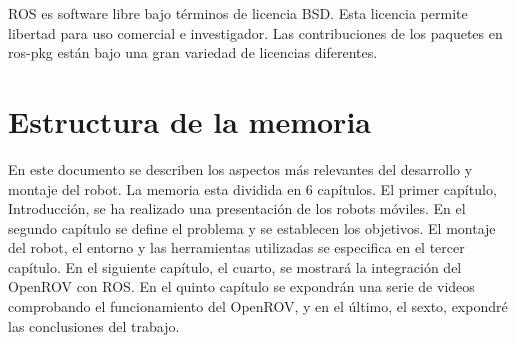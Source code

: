 ROS es software libre bajo términos de licencia BSD. Esta licencia permite libertad para uso comercial e investigador. Las contribuciones de los paquetes en ros-pkg están bajo una gran variedad de licencias diferentes.

\section{Estructura de la memoria}
\label{cap:estructuradelamemoria}
En este documento se describen los aspectos más relevantes del desarrollo y montaje del robot. La memoria esta dividida en 6 capítulos. 
El primer capítulo, Introducción, se ha realizado una presentación de los robots móviles. En el segundo capítulo se define el problema y se establecen los objetivos. El montaje del robot, el entorno y las herramientas utilizadas se especifica en el tercer capítulo. En el siguiente capítulo, el cuarto, se mostrará la integración del OpenROV con ROS. En el quinto capítulo se expondrán una serie de videos comprobando el funcionamiento del OpenROV, y en el último, el sexto, expondré las conclusiones del trabajo.
